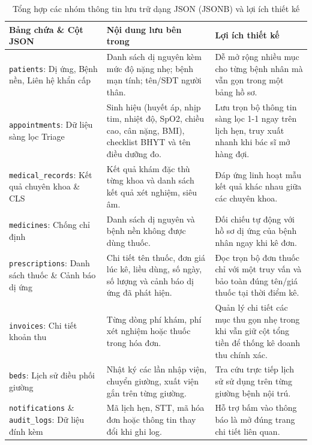 \documentclass[12pt,a4paper]{report}
\begin{document}
\begin{table}[H]
  \centering
  \caption{Tổng hợp các nhóm thông tin lưu trữ dạng JSON (JSONB) và lợi ích thiết kế}
  \label{tab:jsonb}
  \begin{tabularx}{\textwidth}{@{}p{4.3cm} X X@{}}
    \toprule
    \textbf{Bảng chứa \& Cột JSON} & \textbf{Nội dung lưu bên trong} & \textbf{Lợi ích thiết kế} \\
    \midrule
    \texttt{patients}: Dị ứng, Bệnh nền, Liên hệ khẩn cấp & Danh sách dị nguyên kèm mức độ nặng nhẹ; bệnh mạn tính; tên/SĐT người thân. & Dễ mở rộng nhiều mục cho từng bệnh nhân mà vẫn gọn trong một bảng hồ sơ. \\
    \addlinespace
    \texttt{appointments}: Dữ liệu sàng lọc Triage & Sinh hiệu (huyết áp, nhịp tim, nhiệt độ, SpO2, chiều cao, cân nặng, BMI), checklist BHYT và tên điều dưỡng đo. & Lưu trọn bộ thông tin sàng lọc 1-1 ngay trên lịch hẹn, truy xuất nhanh khi bác sĩ mở hàng đợi. \\
    \addlinespace
    \texttt{medical\_records}: Kết quả chuyên khoa \& CLS & Kết quả khám đặc thù từng khoa và danh sách kết quả xét nghiệm, siêu âm. & Đáp ứng linh hoạt mẫu kết quả khác nhau giữa các chuyên khoa. \\
    \addlinespace
    \texttt{medicines}: Chống chỉ định & Danh sách dị nguyên và bệnh nền không được dùng thuốc. & Đối chiếu tự động với hồ sơ dị ứng của bệnh nhân ngay khi kê đơn. \\
    \addlinespace
    \texttt{prescriptions}: Danh sách thuốc \& Cảnh báo dị ứng & Chi tiết tên thuốc, đơn giá lúc kê, liều dùng, số ngày, số lượng và cảnh báo dị ứng đã phát hiện. & Đọc trọn bộ đơn thuốc chỉ với một truy vấn và bảo toàn đúng tên/giá thuốc tại thời điểm kê. \\
    \addlinespace
    \texttt{invoices}: Chi tiết khoản thu & Từng dòng phí khám, phí xét nghiệm hoặc thuốc trong hóa đơn. & Quản lý chi tiết các mục thu gọn nhẹ trong khi vẫn giữ cột tổng tiền để thống kê doanh thu chính xác. \\
    \addlinespace
    \texttt{beds}: Lịch sử điều phối giường & Nhật ký các lần nhập viện, chuyển giường, xuất viện gắn trên từng giường. & Tra cứu trực tiếp lịch sử sử dụng trên từng giường bệnh nội trú. \\
    \addlinespace
    \texttt{notifications} \& \texttt{audit\_logs}: Dữ liệu đính kèm & Mã lịch hẹn, STT, mã hóa đơn hoặc thông tin thay đổi khi ghi log. & Hỗ trợ bấm vào thông báo là mở đúng trang chi tiết liên quan. \\
    \bottomrule
  \end{tabularx}
\end{table}
\end{document}
